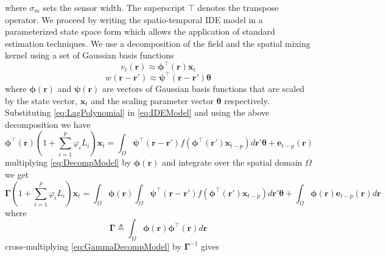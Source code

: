 \documentclass[a4paper,10pt]{article}
\begin{document}
where $\sigma_m$ sets the sensor width. The superscript $\top$ denotes the transpose operator. We proceed by writing the spatio-temporal IDE model in a parameterized state space form which allows the application of standard estimation techniques. We use a decomposition of the field and the spatial mixing kernel using a set of Gaussian basis functions
 \begin{equation}
	\label{eq:FieldDecomp} v_t\left(\mathbf{r}\right) \approx \boldsymbol{\phi}^{\top}\left(\mathbf{r}\right) \mathbf{x}_t
\end{equation}
\begin{equation}\label{eq:KernelDecomp}
	 w\left(\mathbf{r}-\mathbf{r}'\right) \approx\boldsymbol{\psi}^\top\left(\mathbf{r}-\mathbf{r}'\right) \boldsymbol{\theta}
\end{equation}
where $\mathbf{\boldsymbol{\phi}}(\mathbf{r})$ and $\mathbf{\boldsymbol{\psi}}(\mathbf{r})$ are  vectors of Gaussian basis functions that are scaled by the state vector, $\mathbf{x}_t$ and the scaling parameter vector $\boldsymbol\theta$ respectively. Substituting \eqref{eq:LagPolynomial} in \eqref{eq:IDEModel} and using the above decomposition we have
\begin{equation}\label{eq:DecompModel}
\boldsymbol{\phi}^{\top}\left(\mathbf{r}\right)(1+\sum_{i=1}^{p}\varphi_i L_i) \mathbf{x}_t=\int_{\Omega}\boldsymbol{\psi}^\top\left(\mathbf{r}-\mathbf{r}'\right) f(\boldsymbol{\phi}^{\top}\left(\mathbf{r'}\right) \mathbf{x}_{t-p})d\mathbf r'\boldsymbol{\theta}+\mathbf e_{t-p}(\mathbf r)
 \end{equation}
multiplying \eqref{eq:DecompModel} by $\boldsymbol \phi(\mathbf r)$ and integrate over the spatial domain $\Omega$ we get
\begin{equation}\label{eq:GammaDecompModel}
 \boldsymbol \Gamma (1+\sum_{i=1}^{p}\varphi_i L_i) \mathbf{x}_t=\int_{\Omega}\boldsymbol \phi(\mathbf r)\int_{\Omega}\boldsymbol{\psi}^\top\left(\mathbf{r}-\mathbf{r}'\right) f(\boldsymbol{\phi}^{\top}\left(\mathbf{r'}\right) \mathbf{x}_{t-p})d\mathbf r'\boldsymbol{\theta}+\int_{\Omega}\boldsymbol\phi(\mathbf r)\mathbf e_{t-p}(\mathbf r)d\mathbf r
\end{equation}
where 
\begin{equation}\label{eq:DefGamma}
	\boldsymbol{\Gamma} \triangleq \int_\Omega {\boldsymbol{\phi} \left(\mathbf{r}\right)\boldsymbol{\phi} ^{\top}\left(\mathbf{r}\right)d\mathbf{r}} 
\end{equation}
cross-multiplying \eqref{eq:GammaDecompModel} by $\boldsymbol{\Gamma}^{-1}$ gives
\end{document}
